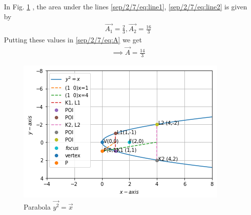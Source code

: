 In Fig. \ref{sep/2/7/fig:parab_tangent}	, the  area under the lines \eqref{sep/2/7/eq:line1}, \eqref{sep/2/7/eq:line2} is given by
\begin{align}
\vec{A_1} =\frac{2}{3},
\vec{A_2}=\frac{16}{3}  
\end{align}
Putting these values in \eqref{sep/2/7/eq:A} we get
\begin{align}
\implies\boxed{\vec{A} =\frac{14}{3}}
\end{align}
%
\begin{figure}[!ht]
\centering
\includegraphics[width=\columnwidth]{solutions/sep/2/7/download.png}
\caption{Parabola $\vec{y^2} = \vec{x}$ }
\label{sep/2/7/fig:parab_tangent}	
\end{figure}


